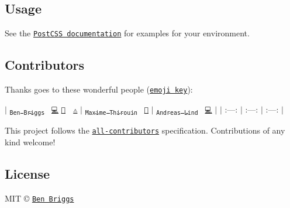 \subsection*{Usage}

See the \href{https://github.com/postcss/postcss#usage}{\tt Post\+C\+SS documentation} for examples for your environment.

\subsection*{Contributors}

Thanks goes to these wonderful people (\href{https://github.com/kentcdodds/all-contributors#emoji-key}{\tt emoji key})\+:

$\vert$ \href{http://beneb.info}{\tt \textsubscript{Ben Briggs}}~\newline
\href{https://github.com/postcss/postcss-filter-plugins/commits?author=ben-eb}{\tt 💻} \href{https://github.com/postcss/postcss-filter-plugins/commits?author=ben-eb}{\tt 📖} 👀 \href{https://github.com/postcss/postcss-filter-plugins/commits?author=ben-eb}{\tt ⚠️} $\vert$ \href{https://moox.io/}{\tt \textsubscript{Maxime Thirouin}}~\newline
\href{https://github.com/postcss/postcss-filter-plugins/commits?author=MoOx}{\tt 📖} $\vert$ \href{https://github.com/papandreou}{\tt \textsubscript{Andreas Lind}}~\newline
\href{https://github.com/postcss/postcss-filter-plugins/commits?author=papandreou}{\tt 💻} $\vert$ $\vert$ \+:---\+: $\vert$ \+:---\+: $\vert$ \+:---\+: $\vert$

This project follows the \href{https://github.com/kentcdodds/all-contributors}{\tt all-\/contributors} specification. Contributions of any kind welcome!

\subsection*{License}

M\+IT © \href{http://beneb.info}{\tt Ben Briggs} 